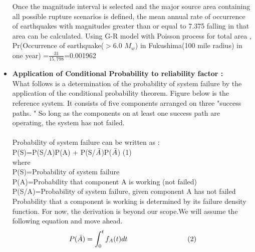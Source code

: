 \documentclass{article}
\begin{document}
\begin{itemize}
Once the magnitude interval is selected and the major source area containing all possible rupture scenarios is defined, the mean annual rate of occurrence of earthquakes with magnitudes greater than or equal to 7.375 falling in that area can be calculated\cite{cite7}. Using G-R model with Poisson process for total area\cite{cite3} ,\\

Pr(Occurrence of earthquake($>$6.0 $M_{w}$) in Fukushima(100 mile radius) in one year) =$\frac{31}{15,798}$=0.001962  \cite{cite6}
\\

\newpage
\item \textbf{Application of Conditional Probability to reliability factor :}\\
\normalsize
What follows is a determination of the probability of system failure by the application of the conditional probability theorem. Figure below is the reference system. It consists of five components arranged on three "success paths. " So long as the components on at least one success path are operating, the system has not failed.\\ \\
    Probability of system failure can be written as : \\\vspace{3mm}
    \hspace{50mm}P(S)=P(S/A)P(A) + P(S/$\Bar{A}$)P($\Bar{A}$)\cite{cite9}\hspace{30mm} (1)\\
    where\\\vspace{2mm}
    \hspace{15mm}P(S)=Probability of system failure\\\vspace{2mm}
    \hspace{15mm}P(A)=Probability that component A is working (not failed)\\\vspace{2mm}
    \hspace{15mm}P(S/A)=Probability of system failure, given component A has not failed\\\vspace{2mm}
    Probability that a component is working is determined by its failure density function. For now, the derivation is beyond our scope.We will assume the following equation and move ahead. 
    $$P(\Bar{A})=\int_{0}^{t}f_{A}(t)dt \hspace{30mm} (2)$$

\end{itemize}
\end{document}
